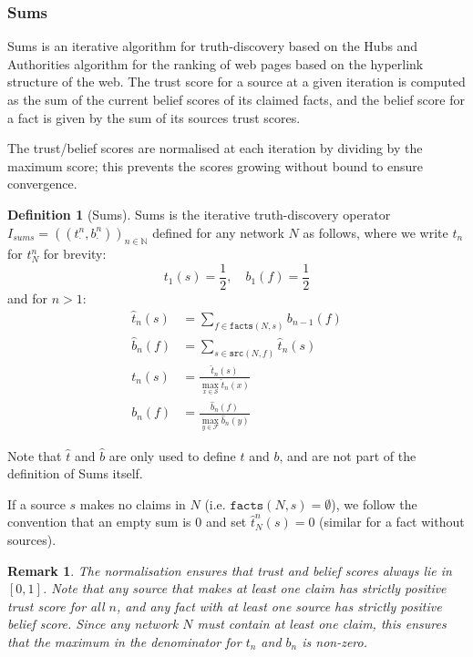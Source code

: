 \documentclass{article}
\theoremstyle{definition} \newtheorem{definition}{Definition}
\theoremstyle{definition} \newtheorem{example}{Example}
\theoremstyle{plain} \newtheorem{axiom}{Axiom}
\theoremstyle{plain} \newtheorem*{remark}{Remark}
\theoremstyle{remark} \newtheorem*{notation}{Notation}
\theoremstyle{plain} \newtheorem{lemma}{Lemma}
\theoremstyle{plain} \newtheorem{theorem}{Theorem}
\theoremstyle{plain} \newtheorem{proposition}{Proposition}
\renewcommand{\S}{\mathcal{S}}  %
\newcommand{\F}{\mathcal{F}}
\newcommand{\Nat}{\mathbb{N}}
\newcommand{\src}{\texttt{src}}
\newcommand{\fact}{\texttt{facts}}
\newcommand{\pl}{\cdot}  %
\begin{document}
\subsubsection{Sums}

Sums\cite{pasternack} is an iterative algorithm for truth-discovery based on
the Hubs and Authorities \cite{kleinberg} algorithm for the ranking of web
pages based on the hyperlink structure of the web. The trust score for a source
at a given iteration is computed as the sum of the current belief scores of its
claimed facts, and the belief score for a fact is given by the sum of its
sources trust scores.

The trust/belief scores are normalised at each iteration by dividing by the
maximum score; this prevents the scores growing without bound to ensure
convergence.

\begin{definition}[Sums]
Sums is the iterative truth-discovery operator $I_{sums} = ((t_\pl^n,
b_\pl^n))_{n \in \Nat}$ defined for any network $N$ as follows, where we write
$t_n$ for $t_N^n$ for brevity:
\[
    t_1(s) = \frac{1}{2}, \quad b_1(f) = \frac{1}{2}
\]
and for $n > 1$:
\begin{align*}
    \hat{t}_n(s) & = \sum_{f \in \fact(N, s)}{b_{n - 1}(f)} \\
    \hat{b}_n(f) & = \sum_{s \in \src(N, f)}{\hat{t}_n(s)} \\
    t_n(s) & = \frac{\hat{t}_n(s)}{\max\limits_{x \in \S}{\hat{t}_n(x)}} \\
    b_n(f) & = \frac{\hat{b}_n(f)}{\max\limits_{y \in \F}{\hat{b}_n(y)}}
\end{align*}

Note that $\hat{t}$ and $\hat{b}$ are only used to define $t$ and $b$, and are
not part of the definition of Sums itself.

If a source $s$ makes no claims in $N$ (i.e. $\fact(N, s) = \emptyset$), we
follow the convention that an empty sum is 0 and set $\hat{t}_N^n(s)=0$
(similar for a fact without sources).
\end{definition}

\begin{remark}
The normalisation ensures that trust and belief scores always lie in $[0, 1]$.
Note that any source that makes at least one claim has strictly positive trust
score for all $n$, and any fact with at least one source has strictly positive
belief score. Since any network $N$ must contain at least one claim, this
ensures that the maximum in the denominator for $t_n$ and $b_n$ is non-zero.
\end{remark}
\end{document}

